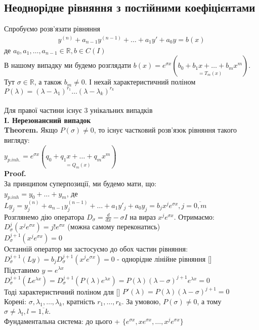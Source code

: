 \documentclass[a4paper, 14pt]{extarticle}
\def\huge{\displaystyle}
\def\proof{\textbf{Proof.}\\}
\begin{document}
\subsection{Неоднорідне рівняння з постійними коефіцієнтами}
Спробуємо розв'язати рівняння
\begin{align*}
y^{(n)} + a_{n-1}y^{(n-1)}+\dots+a_1y'+a_0y = b(x)
\end{align*}
де $a_0, a_1,\dots,a_{n-1} \in \mathbb{R}, b \in C(I)$\\
В нашому випадку ми будемо розглядати $b(x) = e^{\sigma x} (\underset{= T_m(x)}{b_0 + b_1 x + \dots + b_m x^m} )$. Тут $\sigma \in \mathbb{R}$, а також $b_m \neq 0$.
І нехай характеристичний поліном $P(\lambda) = (\lambda - \lambda_1)^{r_1} \dots (\lambda - \lambda_k)^{r_k}$\\
\\
 Для правої частини існує 3 унікальних випадків\\
\textbf{I. Нерезонансний випадок}\\
\textbf{Theorem.} Якщо $P(\sigma) \neq 0$, то існує частковий розв'язок рівняння такого вигляду:\\
$y_{p.inh.} = e^{\sigma x} (\underset{= Q_m(x)}{q_0 + q_1 x + \dots + q_m x^m})$\\
\proof
За принципом суперпозиції, ми будемо мати, що:\\
$y_{p.inh} = y_0 + \dots + y_m$, де\\
$Ly_j = y^{(n)}_j + a_{n-1}y^{(n-1)}_j +\dots+a_1y'_j +a_0y_j = b_j x^j e^{\sigma x} , j = \overline{0,m}$\\
Розглянемо дію оператора $\huge D_{\sigma} = \frac{d}{dx} - \sigma I$ на вираз $x^j e^{\sigma x}$. Отримаємо:\\
$\huge D^j_{\sigma} \left( x^j e^{\sigma x} \right) = j!e^{\sigma x}$ (можна самому переконатись)\\
$\huge D^{j+1}_{\sigma} \left( x^j e^{\sigma x} \right) = 0$\\
Останній оператор ми застосуємо до обох частин рівняння:\\
$\huge D^{j+1}_{\sigma} (Ly) = b_j \huge D^{j+1}_{\sigma} \left( x^j e^{\sigma x} \right) = 0$ - однорідне лінійне рівняння []\\
Підставимо $y = e^{\lambda x}$ \\
$\huge D^{j+1}_{\sigma} (Le^{\lambda x}) = \huge D^{j+1}_{\sigma} (P(\lambda)e^{\lambda x}) = P(\lambda) (\lambda - \sigma)^{j+1}e^{\lambda x} = 0$\\
Тоді характеристичний поліном для [] $P'(\lambda) = P(\lambda)(\lambda-\sigma)^{j+1} = 0$\\
Корені: $\sigma, \lambda_1, \dots, \lambda_k$, кратність $r_1, \dots, r_k$. За умовою, $P(\sigma) \neq 0$, а тому $\sigma \neq \lambda_l, l = \overline{1,k}$.\\
Фундаментальна система: до цього + $\{e^{\sigma x}, x e^{\sigma x}, \dots, x^j e^{\sigma x} \}$
\end{document}
